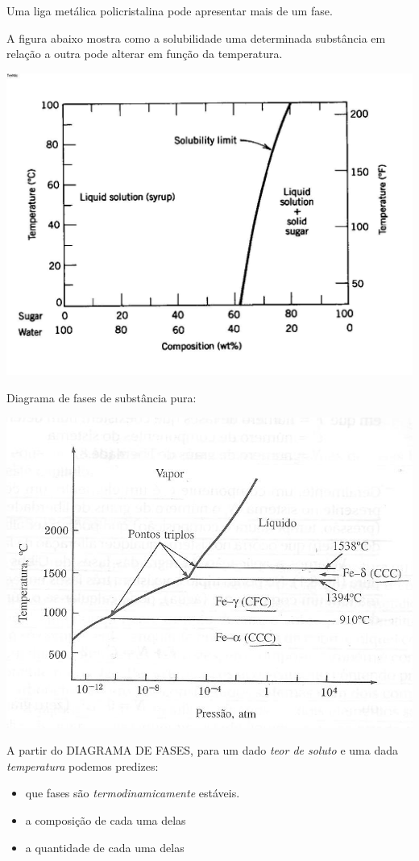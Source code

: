 Uma liga metálica policristalina pode apresentar mais de um fase.

A figura abaixo mostra como a solubilidade uma determinada substância em relação a outra pode alterar em função da temperatura.


\includegraphics[scale=0.3,trim={0 0 0 0}]{figures/soluTemp}

Diagrama de fases de substância pura: 

\includegraphics[scale=0.4,trim={0 0 0 0}]{figures/diagramFe}

A partir do DIAGRAMA DE FASES, para um dado \emph{teor de soluto} e uma dada \emph{temperatura} podemos predizes:


\begin{itemize}
	\item que fases são \emph{termodinamicamente} estáveis.
	\item a composição de cada uma delas
	\item a quantidade de cada uma delas
\end{itemize}


